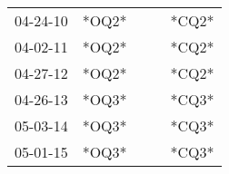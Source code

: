 \begin{supertabular}{p{0.07\textwidth}p{0.06\textwidth}p{0.02\textwidth}p{0.02\textwidth}p{0.06\textwidth}}
 04-24-10\textsuperscript{} &  *OQ2* &   &   &  *CQ2* \\
 04-02-11\textsuperscript{} &  *OQ2* &   &   &  *CQ2* \\
 04-27-12\textsuperscript{} &  *OQ2* &   &   &  *CQ2* \\
 04-26-13\textsuperscript{} &  *OQ3* &   &   &  *CQ3* \\
 05-03-14\textsuperscript{} &  *OQ3* &   &   &  *CQ3* \\
 05-01-15\textsuperscript{} &  *OQ3* &   &   &  *CQ3* \\
\end{supertabular}

